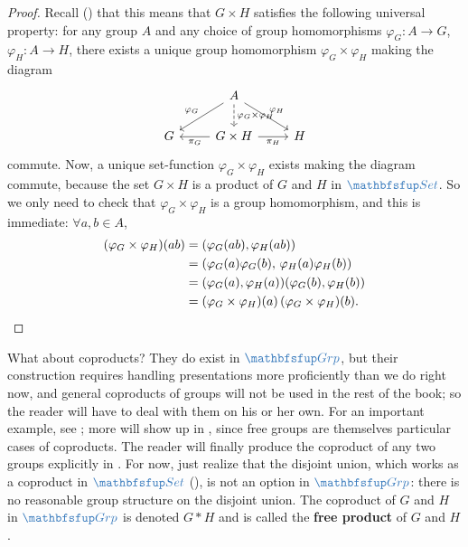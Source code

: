 \begin{proof}
  Recall () that this means that
  $G \times H$ satisfies the following universal property: for any
  group $A$ and any choice of group homomorphisms
  $\varphi_G : A \to G$, $\varphi_H : A \to H$, there exists a unique
  group homomorphism $\varphi_G \times \varphi_H$ making the diagram
  \[
    \begin{tikzcd}
      & A \arrow[dl, "\varphi_G"'] \arrow[d, dashed, "\varphi_G \times \varphi_H"] \arrow[dr, "\varphi_H"] & \\
      G & G \times H \arrow[l, "\pi_G"] \arrow[r, "\pi_H"'] & H
    \end{tikzcd}
  \]
  commute. Now, a unique set-function $\varphi_G \times \varphi_H$
  exists making the diagram commute, because the set $G \times H$ is a
  product of $G$ and $H$ in $\categ{Set}$. So we only need to check
  that $\varphi_G \times \varphi_H$ is a group homomorphism, and this
  is immediate: $\forall a, b \in A$,
  \begin{align*}
    (\varphi_G \times \varphi_H)(ab)
    &= (\varphi_G(ab), \varphi_H(ab)) \\
    &= (\varphi_G(a)\varphi_G(b),\, \varphi_H(a)\varphi_H(b)) \\
    &= (\varphi_G(a), \varphi_H(a))(\varphi_G(b), \varphi_H(b)) \\
    &= (\varphi_G \times \varphi_H)(a)\,(\varphi_G \times \varphi_H)(b). \qedhere
  \end{align*}
\end{proof}
What about coproducts? They do exist in $\categ{Grp}$, but their
construction requires handling presentations more proficiently than we
do right now, and general coproducts of groups will not be used in the
rest of the book; so the reader will have to deal with them on his or
her own. For an important example, see ;
more will show up in
,
since free groups are
themselves particular cases of coproducts. The reader will finally
produce the coproduct of any two groups explicitly in
. For now, just realize
that the disjoint union, which works as a coproduct in $\categ{Set}$
(), is not an option in
$\categ{Grp}$: there is no reasonable group structure on the disjoint
union. The coproduct of $G$ and $H$ in $\categ{Grp}$ is denoted
$G * H$ and is called the \textbf{free product} of $G$ and $H$.

